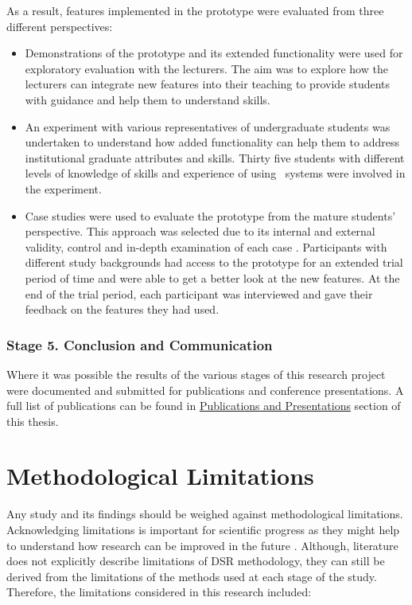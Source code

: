 As a result, features implemented in the prototype were evaluated from three
different perspectives: 

\begin{itemize}
  \item Demonstrations of the prototype and its extended functionality were used
  for exploratory evaluation with the lecturers. The aim was to explore how the
  lecturers can integrate new features into their teaching to provide students
  with guidance and help them to understand \LLLs skills.
  
  \item An experiment with various representatives of undergraduate students
  was undertaken to understand how added functionality can help them to address
  institutional graduate attributes and \LLLs skills. Thirty five students with
  different levels of knowledge of \LLLs skills and experience of using
  \ep~systems were involved in the experiment.

  \item Case studies were used to evaluate the prototype from the mature
  students' perspective. This approach was selected due to its internal and
  external validity, control and in-depth examination of each case \citep{Yin2009}.
  Participants with different study backgrounds had access to the prototype for
  an extended trial period of time and were able to get a better look at the new
  features. At the end of the trial period, each participant was interviewed and
  gave their feedback on the features they had used.
\end{itemize}

\subsubsection{Stage 5. Conclusion and Communication}

Where it was possible the results of the various stages of this research project
were documented and submitted for publications and conference presentations. A
full list of publications can be found in \hyperref[sec:pub]{Publications and
Presentations} section of this thesis.

\section{Methodological Limitations}
\label{sec:limits}

Any study and its findings should be weighed against methodological
limitations. Acknowledging limitations is important for scientific progress as
they might help to understand how research can be improved in the future
\citep{Ioannidis2007}. Although, literature does not explicitly describe
limitations of DSR methodology, they can still be derived from the limitations
of the methods used at each stage of the study. Therefore, the limitations
considered in this research included:

